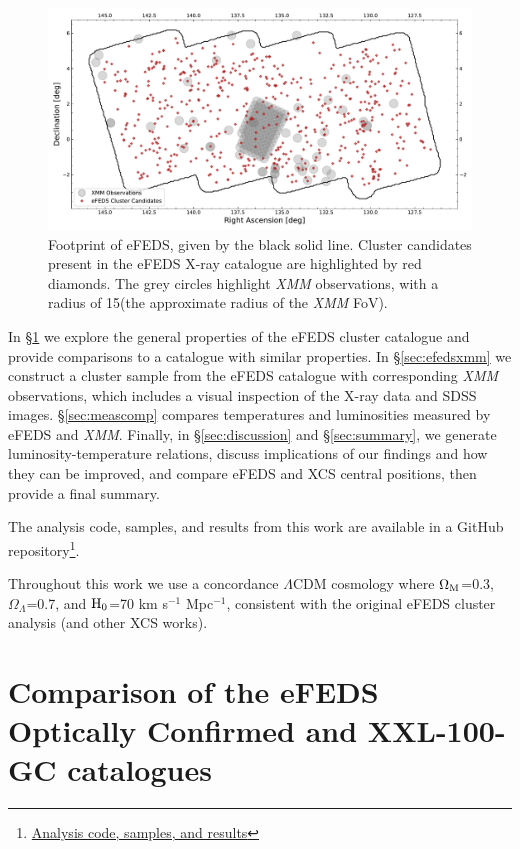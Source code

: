 \documentclass[fleqn,usenatbib]{mnras}
\begin{document}
\begin{figure}
    \centering
    \includegraphics[width=1.0\textwidth]{images/efeds_outline_xmm_pointings.pdf}
    \caption[]{Footprint of eFEDS, given by the black solid line. Cluster candidates present in the eFEDS X-ray catalogue are highlighted by red diamonds. The grey circles highlight {\em XMM} observations, with a radius of 15\arcmin (the approximate radius of the {\em XMM} FoV).}
    \label{fig:efedsxcsclusters}
\end{figure}

In \S\ref{sec:efedsproperties} we explore the general properties of the eFEDS cluster catalogue and provide comparisons to a catalogue with similar properties. In \S\ref{sec:efedsxmm} we construct a cluster sample from the eFEDS catalogue with corresponding {\em XMM} observations, which includes a visual inspection of the X-ray data and SDSS images. \S\ref{sec:meascomp} compares temperatures and luminosities measured by eFEDS and {\em XMM}. Finally, in \S\ref{sec:discussion} and \S\ref{sec:summary}, we generate luminosity-temperature relations, discuss implications of our findings and how they can be improved, and compare eFEDS and XCS central positions, then provide a final summary.

The analysis code, samples, and results from this work are available in a GitHub repository\footnote{\href{https://github.com/DavidT3/eFEDS-XCS-Paper}{Analysis code, samples, and results}}.

Throughout this work we use a concordance $\Lambda$CDM cosmology where $\Omega_{\rm{M}}$=0.3, $\Omega_{\Lambda}$=0.7, and $\rm{H}_{0}$=70 km s$^{-1}$ Mpc$^{-1}$, consistent with the original eFEDS cluster analysis (and other XCS works).

\section{Comparison of the \lowercase{e}FEDS Optically Confirmed and XXL-100-GC catalogues}
\label{sec:efedsproperties}
\end{document}
